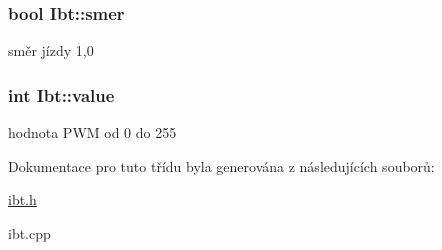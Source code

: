 \subsubsection[{\texorpdfstring{smer}{smer}}]{\setlength{\rightskip}{0pt plus 5cm}bool Ibt\+::smer\hspace{0.3cm}{\ttfamily [private]}}\hypertarget{class_ibt_ab15472546c05e0760f6a1b282fad58fb}{}\label{class_ibt_ab15472546c05e0760f6a1b282fad58fb}
směr jízdy 1,0 
\subsubsection[{\texorpdfstring{value}{value}}]{\setlength{\rightskip}{0pt plus 5cm}int Ibt\+::value\hspace{0.3cm}{\ttfamily [private]}}\hypertarget{class_ibt_a8e62674f6908473dc87800a656142d7c}{}\label{class_ibt_a8e62674f6908473dc87800a656142d7c}
hodnota P\+WM od 0 do 255 

Dokumentace pro tuto třídu byla generována z následujících souborů\+:\begin{DoxyCompactItemize}
\item 
\hyperlink{ibt_8h}{ibt.\+h}\item 
ibt.\+cpp\end{DoxyCompactItemize}

